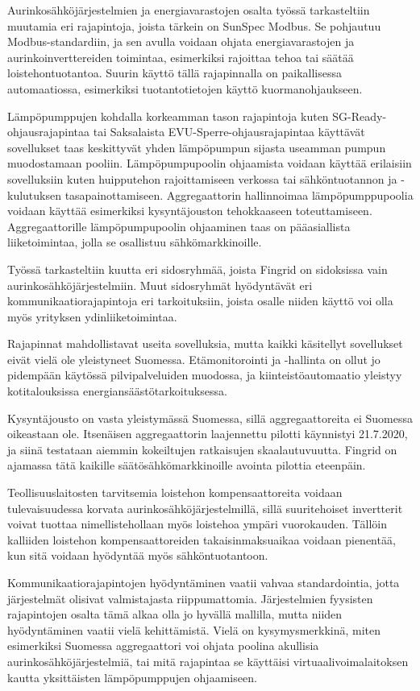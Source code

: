 Aurinkosähköjärjestelmien ja energiavarastojen osalta työssä tarkasteltiin muutamia eri rajapintoja, joista tärkein on SunSpec Modbus. Se pohjautuu Modbus-standardiin, ja sen avulla voidaan ohjata energiavarastojen ja aurinkoinverttereiden toimintaa, esimerkiksi rajoittaa tehoa tai säätää loistehontuotantoa. Suurin käyttö tällä rajapinnalla on paikallisessa automaatiossa, esimerkiksi tuotantotietojen käyttö kuormanohjaukseen.

Lämpöpumppujen kohdalla korkeamman tason rajapintoja kuten SG-Ready-ohjausrajapintaa tai Saksalaista EVU-Sperre-ohjausrajapintaa käyttävät sovellukset taas keskittyvät yhden lämpöpumpun sijasta useamman pumpun muodostamaan pooliin. Lämpöpumpupoolin ohjaamista voidaan käyttää erilaisiin sovelluksiin kuten huipputehon rajoittamiseen verkossa tai sähköntuotannon ja -kulutuksen tasapainottamiseen. Aggregaattorin hallinnoimaa lämpöpumppupoolia voidaan käyttää esimerkiksi kysyntäjouston tehokkaaseen toteuttamiseen. Aggregaattorille lämpöpumpupoolin ohjaaminen taas on pääasiallista liiketoimintaa, jolla se osallistuu sähkömarkkinoille.

Työssä tarkasteltiin kuutta eri sidosryhmää, joista Fingrid on sidoksissa vain aurinkosähköjärjestelmiin. Muut sidosryhmät hyödyntävät eri kommunikaatiorajapintoja eri tarkoituksiin, joista osalle niiden käyttö voi olla myös yrityksen ydinliiketoimintaa.

Rajapinnat mahdollistavat useita sovelluksia, mutta kaikki käsitellyt sovellukset eivät vielä ole yleistyneet Suomessa. Etämonitorointi ja -hallinta on ollut jo pidempään käytössä pilvipalveluiden muodossa, ja kiinteistöautomaatio yleistyy kotitalouksissa energiansäästötarkoituksessa.

Kysyntäjousto on vasta yleistymässä Suomessa, sillä aggregaattoreita ei Suomessa oikeastaan ole. Itsenäisen aggregaattorin laajennettu pilotti käynnistyi 21.7.2020, ja siinä testataan aiemmin kokeiltujen ratkaisujen skaalautuvuutta. Fingrid on ajamassa tätä kaikille säätösähkömarkkinoille avointa pilottia eteenpäin.

Teollisuuslaitosten tarvitsemia loistehon kompensaattoreita voidaan tulevaisuudessa korvata aurinkosähköjärjestelmillä, sillä suuritehoiset invertterit voivat tuottaa nimellistehollaan myös loistehoa ympäri vuorokauden. Tällöin kalliiden loistehon kompensaattoreiden takaisinmaksuaikaa voidaan pienentää, kun sitä voidaan hyödyntää myös sähköntuotantoon.

Kommunikaatiorajapintojen hyödyntäminen vaatii vahvaa standardointia, jotta järjestelmät olisivat valmistajasta riippumattomia. Järjestelmien fyysisten rajapintojen osalta tämä alkaa olla jo hyvällä mallilla, mutta niiden hyödyntäminen vaatii vielä kehittämistä. Vielä on kysymysmerkkinä, miten esimerkiksi Suomessa aggregaattori voi ohjata poolina akullisia aurinkosähköjärjestelmiä, tai mitä rajapintaa se käyttäisi virtuaalivoimalaitoksen kautta yksittäisten lämpöpumppujen ohjaamiseen.
